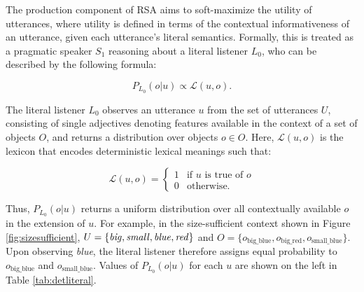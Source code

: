 \documentclass[11pt]{article}
\newcommand{\denote}[1]{\mbox{ $[\![ #1 ]\!]$}}
\newcommand{\tableref}[1]{Table \ref{#1}}
\newcommand{\figref}[1]{Figure \ref{#1}}
\begin{document}
The production component of RSA aims to soft-maximize the utility of utterances, where utility is defined in terms of the contextual informativeness of an utterance, given each utterance's literal semantics. Formally, this is treated as a pragmatic speaker $S_1$ reasoning about a literal listener $L_0$, who can be described by the following formula:

\begin{equation}
\label{eq:listener}
P_{L_0}(o | u) \propto \mathcal{L}(u,o).
\end{equation}


The literal listener $L_0$ observes an utterance $u$ from the set of  utterances $U$, consisting of single adjectives denoting features available in the context of a set of objects  $O$, and returns a distribution over objects $o \in O$. Here, $\mathcal{L}(u,o)$ is the lexicon that encodes deterministic lexical meanings such that: 

\begin{equation}
\mathcal{L}(u,o) = \left\{
 \begin{array}{rl}
  1 & \text{if } u \text{ is true of } o\\
   0 & \text{otherwise}.
 \end{array} \right.
\end{equation}

 Thus, $P_{L_0}(o | u)$ returns a uniform distribution over all contextually available $o$ in the extension of $u$. For example, in the size-sufficient context shown in \figref{fig:sizesufficient}, $U = \{\textrm{\emph{big}}, \textrm{\emph{small}}, \textrm{\emph{blue}}, \textrm{\emph{red}}\}$ and $O = \{o_{\textrm{big\_blue}}, o_{\textrm{big\_red}}, o_{\textrm{small\_blue}}\}$. Upon observing \emph{blue}, the literal listener therefore assigns equal probability to  $o_{\textrm{big\_blue}}$ and $o_{\textrm{small\_blue}}$. Values of $P_{L_0}(o | u)$ for each $u$ are shown on the left in \tableref{tab:detliteral}.
\end{document}
